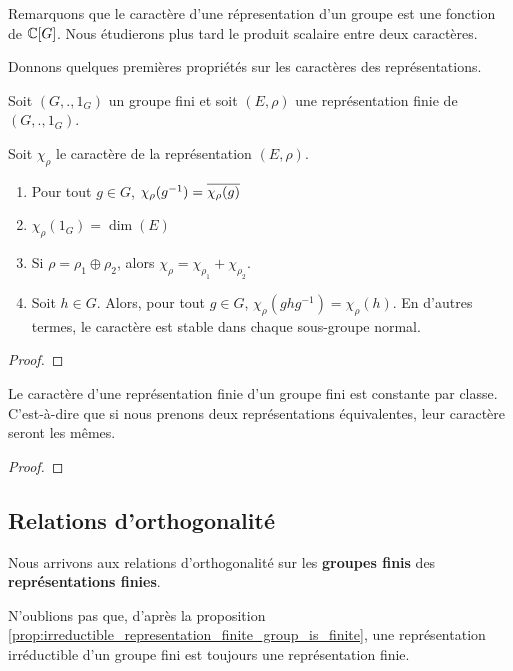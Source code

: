 Remarquons que le caractère d'une répresentation d'un groupe est une fonction de
$\mathbb{C}[G]$. Nous étudierons plus tard le produit scalaire entre deux
caractères.

Donnons quelques premières propriétés sur les caractères des représentations.

\begin{proposition}
	Soit $(G, ., 1_{G})$ un groupe fini et soit $(E, \rho)$ une
	représentation finie de $(G, ., 1_{G})$.

	Soit $\chi_{\rho}$ le caractère de la représentation $(E,
	\rho)$.
	\begin{enumerate}
		\item Pour tout $g \in G$, $\chi_{\rho}(g^{-1}) =
			\overline{\chi_{\rho}(g)}$
		\item $\chi_{\rho}(1_{G}) = \dim(E)$
		\item Si $\rho = \rho_{1} \oplus \rho_{2}$, alors $\chi_{\rho} =
			\chi_{\rho_{1}} + \chi_{\rho_{2}}$.
		\item Soit $h \in G$. Alors, pour tout $g \in G$,
			$\chi_{\rho}(ghg^{-1}) = \chi_{\rho}(h)$. En d'autres termes, le
			caractère est stable dans chaque sous-groupe normal.
	\end{enumerate}
\end{proposition}

\ifdefined\outputproof
\begin{proof}

\end{proof}
\fi

\begin{proposition}
	Le caractère d'une représentation finie d'un groupe fini est constante par
	classe. C'est-à-dire que si nous prenons deux représentations équivalentes,
	leur caractère seront les mêmes.
\end{proposition}

\ifdefined\outputproof
\begin{proof}

\end{proof}
\fi

\subsection{Relations d'orthogonalité}

Nous arrivons aux relations d'orthogonalité sur les \textbf{groupes finis} des
\textbf{représentations finies}.

N'oublions pas que, d'après la proposition
\ref{prop:irreductible_representation_finite_group_is_finite}, une
représentation irréductible d'un groupe fini est toujours une représentation
finie.

